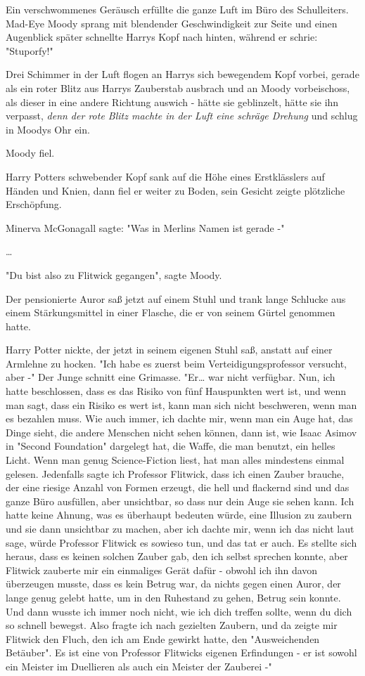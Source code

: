 {Ein verschwommenes Geräusch erfüllte die ganze Luft im Büro des Schulleiters. Mad-Eye Moody sprang mit blendender Geschwindigkeit zur Seite und einen Augenblick später schnellte Harrys Kopf nach hinten, während er schrie: "Stuporfy!"

Drei Schimmer in der Luft flogen an Harrys sich bewegendem Kopf vorbei, gerade als ein roter Blitz aus Harrys Zauberstab ausbrach und an Moody vorbeischoss, als dieser in eine andere Richtung auswich - hätte sie geblinzelt, hätte sie ihn verpasst, \emph{denn der rote Blitz machte in der Luft eine schräge Drehung} und schlug in Moodys Ohr ein.

Moody fiel.

Harry Potters schwebender Kopf sank auf die Höhe eines Erstklässlers auf Händen und Knien, dann fiel er weiter zu Boden, sein Gesicht zeigte plötzliche Erschöpfung.

Minerva McGonagall sagte: "Was in Merlins Namen ist gerade -"

…

"Du bist also zu Flitwick gegangen", sagte Moody.

Der pensionierte Auror saß jetzt auf einem Stuhl und trank lange Schlucke aus einem Stärkungsmittel in einer Flasche, die er von seinem Gürtel genommen hatte.

Harry Potter nickte, der jetzt in seinem eigenen Stuhl saß, anstatt auf einer Armlehne zu hocken. "Ich habe es zuerst beim Verteidigungsprofessor versucht, aber -" Der Junge schnitt eine Grimasse. "Er… war nicht verfügbar. Nun, ich hatte beschlossen, dass es das Risiko von fünf Hauspunkten wert ist, und wenn man sagt, dass ein Risiko es wert ist, kann man sich nicht beschweren, wenn man es bezahlen muss. Wie auch immer, ich dachte mir, wenn man ein Auge hat, das Dinge sieht, die andere Menschen nicht sehen können, dann ist, wie Isaac Asimov in "Second Foundation" dargelegt hat, die Waffe, die man benutzt, ein helles Licht. Wenn man genug Science-Fiction liest, hat man alles mindestens einmal gelesen. Jedenfalls sagte ich Professor Flitwick, dass ich einen Zauber brauche, der eine riesige Anzahl von Formen erzeugt, die hell und flackernd sind und das ganze Büro ausfüllen, aber unsichtbar, so dass nur dein Auge sie sehen kann. Ich hatte keine Ahnung, was es überhaupt bedeuten würde, eine Illusion zu zaubern und sie dann unsichtbar zu machen, aber ich dachte mir, wenn ich das nicht laut sage, würde Professor Flitwick es sowieso tun, und das tat er auch. Es stellte sich heraus, dass es keinen solchen Zauber gab, den ich selbst sprechen konnte, aber Flitwick zauberte mir ein einmaliges Gerät dafür - obwohl ich ihn davon überzeugen musste, dass es kein Betrug war, da nichts gegen einen Auror, der lange genug gelebt hatte, um in den Ruhestand zu gehen, Betrug sein konnte. Und dann wusste ich immer noch nicht, wie ich dich treffen sollte, wenn du dich so schnell bewegst. Also fragte ich nach gezielten Zaubern, und da zeigte mir Flitwick den Fluch, den ich am Ende gewirkt hatte, den "Ausweichenden Betäuber". Es ist eine von Professor Flitwicks eigenen Erfindungen - er ist sowohl ein Meister im Duellieren als auch ein Meister der Zauberei -"

}
